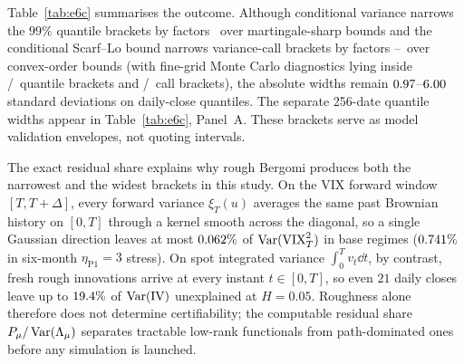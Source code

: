 Table~\ref{tab:e6c} summarises the outcome. Although conditional variance narrows the $99\%$ quantile
brackets by factors \EsixcRatio\ over martingale-sharp bounds and the conditional Scarf--Lo bound narrows
variance-call brackets by factors \EsixcPriceGainLo--\EsixcPriceGainHi\ over convex-order bounds (with
fine-grid Monte Carlo diagnostics lying inside \EsixcInside/\EsixcCells\ quantile brackets and
\EsixcPriceIn/\EsixcPriceN\ call brackets), the absolute widths remain $0.97$--$6.00$ standard deviations
on daily-close quantiles. The separate 256-date quantile widths appear in Table~\ref{tab:e6c}, Panel~A. These brackets serve as model
validation envelopes, not quoting intervals.

The exact residual share explains why rough Bergomi produces both the narrowest and the widest brackets in
this study. On the VIX forward window $[T,T+\Delta]$, every forward variance $\xi_T(u)$ averages the same
past Brownian history on $[0,T]$ through a kernel smooth across the diagonal, so a single Gaussian
direction leaves at most $0.062\%$ of $\operatorname{Var}(\mathrm{VIX}_T^2)$ in base regimes ($0.741\%$
in six-month $\eta_{\mathrm{P1}}=3$ stress). On spot integrated variance $\int_0^T v_t\dd t$, by contrast, fresh rough
innovations arrive at every instant $t\in[0,T]$, so even $21$ daily closes leave up to $19.4\%$ of
$\operatorname{Var}(\mathrm{IV})$ unexplained at $H=0.05$. Roughness alone therefore does not determine certifiability;
the computable residual share $P_\mu/\operatorname{Var}(\Lambda_\mu)$ separates tractable low-rank functionals from
path-dominated ones before any simulation is launched.

%
\ifTwoColumn\else\FloatBarrier\fi
